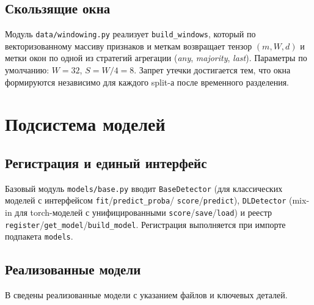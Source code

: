 \documentclass[14pt, a4paper]{extarticle}
\begin{document}
\subsection{Скользящие окна}

Модуль \texttt{data/windowing.py} реализует \texttt{build\_windows}, который
по векторизованному массиву признаков и меткам возвращает тензор
\((m, W, d)\) и метки окон по одной из стратегий агрегации (\emph{any},
\emph{majority}, \emph{last}). Параметры по умолчанию: \(W = 32\),
\(S = W/4 = 8\). Запрет утечки достигается тем, что окна формируются
независимо для каждого split-а после временного разделения.

\section{Подсистема моделей}

\subsection{Регистрация и единый интерфейс}

Базовый модуль \texttt{models/base.py} вводит \texttt{BaseDetector} (для
классических моделей с интерфейсом \texttt{fit}/\texttt{predict\_proba}/
\texttt{score}/\texttt{predict}), \texttt{DLDetector} (mix-in для torch-моделей
с унифицированными \texttt{score}/\texttt{save}/\texttt{load}) и реестр
\texttt{register}/\texttt{get\_model}/\texttt{build\_model}. Регистрация
выполняется при импорте подпакета \texttt{models}.

\subsection{Реализованные модели}

В  сведены реализованные модели с указанием
файлов и ключевых деталей.
\end{document}
